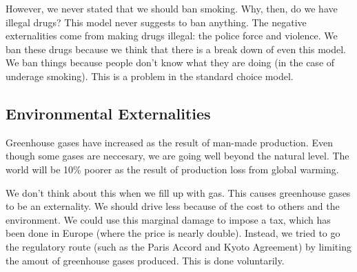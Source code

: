 \documentclass{article}
\begin{document}
However, we never stated that we should ban smoking. Why, then, do we have
illegal drugs? This model never suggests to ban anything. The negative
externalities come from making drugs illegal: the police force and violence. We
ban these drugs because we think that there is a break down of even this model.
We ban things because people don't know what they are doing (in the case of
underage smoking). This is a problem in the standard choice model.

\subsection{ Environmental Externalities }

Greenhouse gases have increased as the result of man-made production. Even
though some gases are neccesary, we are going well beyond the natural level. The
world will be 10\% poorer as the result of production loss from global warming. 

We don't think about this when we fill up with gas. This causes greenhouse gases
to be an externality. We should drive less because of the cost to others and the
environment. We could use this marginal damage to impose a tax, which has been
done in Europe (where the price is nearly double). Instead, we tried to go the
regulatory route (such as the Paris Accord and Kyoto Agreement) by limiting the
amout of greenhouse gases produced. This is done voluntarily. 
\end{document}
